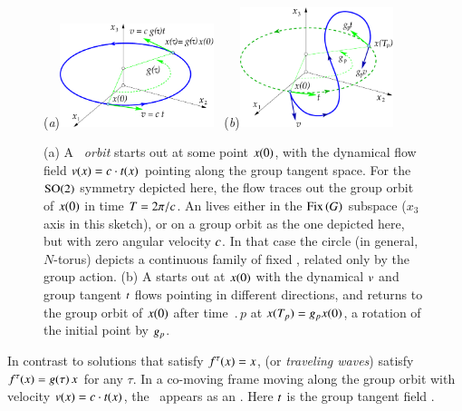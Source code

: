 \documentclass[preprint,number,sort&compress]{elsarticle}
\begin{document}
%
\begin{figure}[ht]
 (\textit{a})\includegraphics[width=0.40\textwidth,clip=true]{reqv}
~(\textit{b})\includegraphics[width=0.40\textwidth,clip=true]{rpo}
\caption{
(a) A {\em \reqv\ orbit} starts out at some point $x(0)$,
with the dynamical flow field $v(x) = c \cdot
t(x)$ pointing along the group tangent space. For
the $\textrm{SO}(2)$ symmetry depicted here, the flow traces out the
group orbit of $x(0)$ in time ${T_{}}=2\pi/c$.
An
{\em \eqv} lives either in the $\mathrm{Fix}\left(G\right)$ subspace
($x_3$ axis in this sketch), or on a group orbit as the one
depicted here, but with zero angular velocity $c$. In
that case the circle (in general, $N$-torus) depicts a
continuous family of fixed \eqva, related only by the group
action.
(b) A {\em \rpo} starts out at $x(0)$ with the dynamical $v$ and
group tangent $t$ flows pointing in different
directions, and returns to the group orbit of $x(0)$ after
time $\period{p}$ at $x({T_{p}})=g_p x (0)$, a
rotation of the initial point by $g_p$.
}
\label{f:rpo}
\end{figure}

In contrast to \emph{\eqv} solutions that satisfy
$f^\tau(x)  =  x$, \emph{\reqva} (or \emph{traveling
waves}) satisfy $f^\tau(x) = g( \tau) \, x$ for
any $\tau$. In a co-moving frame moving along the group orbit
with velocity $v(x) = c \cdot t(x)$,
the \reqv\ appears as an \eqv. Here $t$ is the
group tangent field .
\end{document}
